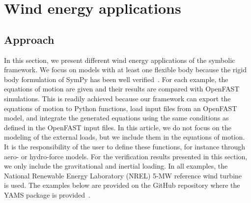 \documentclass[wes, manuscript]{copernicus}
\newcommand{\m}[1]{\boldsymbol{#1}}
\begin{document}




\section{Wind energy applications}
\label{sec:WEapplications}


\subsection{Approach}
In this section, we present different wind energy applications of the symbolic framework. 
We focus on models with at least one flexible body because the rigid body formulation of SymPy has been well verified~\citep{Gede:2013}.
For each example, the equations of motion are given and their results are compared with OpenFAST~\citep{OpenFAST} simulations.
This is readily achieved because our framework can export the equations of motion to Python functions, load input files from an OpenFAST model, and integrate the generated equations using the same conditions as defined in the OpenFAST input files. 
In this article, we do not focus on the modeling of the external loads, but we include them in the equations of motion.
It is the responsibility of the user to define these functions, for instance through aero- or hydro-force models.
For the verification results presented in this section, we only include the gravitational and inertial loading.
In all examples, the National Renewable Energy Laboratory (NREL) 5-MW reference wind turbine~\citep{nrel5mw} is used.
The examples below are provided on the GitHub repository where the YAMS package is provided~\citep{WELIBgithub}.
\end{document}
